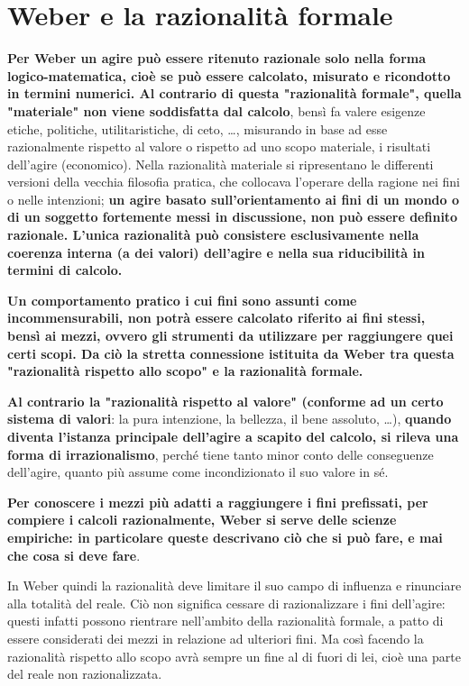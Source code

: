 \section{Weber e la razionalità formale}

\textbf{Per Weber un agire può essere ritenuto razionale solo nella forma logico-matematica, cioè se può essere calcolato, misurato e ricondotto in termini numerici. Al contrario di questa "razionalità formale", quella "materiale" non viene soddisfatta dal calcolo}, bensì fa valere esigenze etiche, politiche, utilitaristiche, di ceto, \dots, misurando in base ad esse razionalmente rispetto al valore o rispetto ad uno scopo materiale, i risultati dell'agire (economico). Nella razionalità materiale si ripresentano le differenti versioni della vecchia filosofia pratica, che collocava l'operare della ragione nei fini o nelle intenzioni; \textbf{un agire basato sull'orientamento ai fini di un mondo o di un soggetto fortemente messi in discussione, non può essere definito razionale. L'unica razionalità può consistere esclusivamente nella coerenza interna (a dei valori) dell'agire e nella sua riducibilità in termini di calcolo.}

\textbf{Un comportamento pratico i cui fini sono assunti come incommensurabili, non potrà essere calcolato riferito ai fini stessi, bensì ai mezzi, ovvero gli strumenti da utilizzare per raggiungere quei certi scopi. Da ciò la stretta connessione istituita da Weber tra questa "razionalità rispetto allo scopo" e la razionalità formale.}

\textbf{Al contrario la "razionalità rispetto al valore" (conforme ad un certo sistema di valori}: la pura intenzione, la bellezza, il bene assoluto, \dots), \textbf{quando diventa l'istanza principale dell'agire a scapito del calcolo, si rileva una forma di irrazionalismo}, perché tiene tanto minor conto delle conseguenze dell'agire, quanto più assume come incondizionato il suo valore in sé.

\textbf{Per conoscere i mezzi più adatti a raggiungere i fini prefissati, per compiere i calcoli razionalmente, Weber si serve delle scienze empiriche: in particolare queste descrivano ciò che si può fare, e mai che cosa si deve fare}.

In Weber quindi la razionalità deve limitare il suo campo di influenza e rinunciare alla totalità del reale. Ciò non significa cessare di razionalizzare i fini dell'agire: questi infatti possono rientrare nell'ambito della razionalità formale, a patto di essere considerati dei mezzi in relazione ad ulteriori fini. Ma così facendo la razionalità rispetto allo scopo avrà sempre un fine al di fuori di lei, cioè una parte del reale non razionalizzata.

